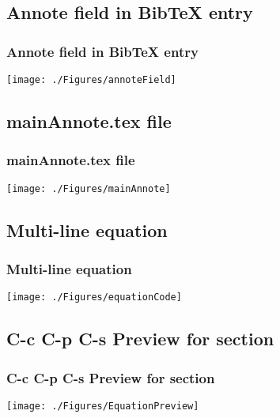 \documentclass{beamer}
\begin{document}
\subsection{Annote field in BibTeX entry}
\begin{frame}
\frametitle{Annote field in BibTeX entry}
\begin{center}
\begin{center}
    \texttt{[image: ./Figures/annoteField]}
\end{center}
\end{center}
\end{frame}
\note{  }


\subsection{mainAnnote.tex file}
\begin{frame}
\frametitle{mainAnnote.tex file}
\begin{center}
\begin{center}
    \texttt{[image: ./Figures/mainAnnote]}
\end{center}
\end{center}
\end{frame}
\note{  }


\subsection{Multi-line equation}
\begin{frame}
\frametitle{Multi-line equation}
\begin{center}
\begin{center}
    \texttt{[image: ./Figures/equationCode]}
\end{center}
\end{center}
\end{frame}
\note{}


\subsection{C-c C-p C-s Preview for section}
\begin{frame}
\frametitle{C-c C-p C-s Preview for section}
\begin{center}
\begin{center}
    \texttt{[image: ./Figures/EquationPreview]}
\end{center}
\end{center}
\end{frame}
\note{}
\end{document}
